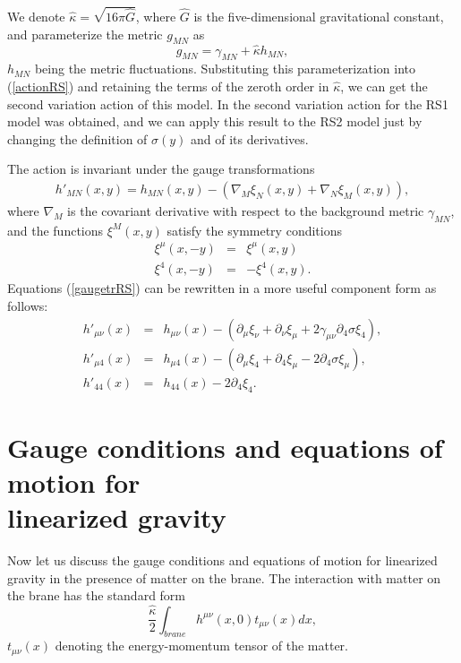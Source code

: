 \documentclass[a4paper,12pt]{article}
\begin{document}
We denote $\hat \kappa = \sqrt{16 \pi \hat G}$, where $\hat G$ is the
five-dimensional gravitational constant, and parameterize the metric
$g_{MN}$ as
\begin{equation}\label{metricpar}
  g_{MN} = \gamma_{MN} + \hat \kappa h_{MN},
\end{equation}
$h_{MN}$ being the metric fluctuations. Substituting this
parameterization into (\ref{actionRS}) and retaining the terms of
the zeroth order in $\hat \kappa$, we can get the second variation
action of this model. In \cite{BKSV} the second
variation action for the  RS1 model was obtained, and we can apply this
result to the RS2 model just  by changing the definition of $\sigma(y)$ and
of its derivatives.

The action is invariant under the gauge transformations
\begin{eqnarray}\label{gaugetrRS}
h'_{MN}(x,y) = h_{MN}(x,y) -(\nabla_M\xi_N(x,y) + \nabla_N\xi_M(x,y) ),
\end{eqnarray}
where $\nabla_M$ is the covariant derivative with respect to the
background metric $\gamma_{MN}$, and the functions $\xi^M(x,y)$
satisfy the symmetry conditions
\begin{eqnarray}\label{orbifoldsym1}
\xi^{\mu}\left(x,-y\right)&=&\xi^{\mu}\left(x,y\right)\\
\nonumber
\xi^{4}\left(x,-y\right)&=&-\xi^{4}\left(x,y\right).
\nonumber
\end{eqnarray}
Equations (\ref{gaugetrRS}) can be rewritten in a more useful
component form as follows:
\begin{eqnarray}\label{gaugetrRSuseful}
h'_{\mu\nu}\left(x\right)&=&h_{\mu\nu}\left(x\right)-\left(
\partial_{\mu}\xi_{\nu} +\partial_{\nu}\xi_{\mu}+2\gamma_{\mu\nu}\partial_{4}\sigma\xi_{4}
\right),\\ \label{gaugetrRSuseful2}
h'_{\mu4}\left(x\right)&=&h_{\mu4}\left(x\right)-\left(
\partial_{\mu}\xi_{4} +\partial_{4}\xi_{\mu}-2\partial_{4}\sigma\xi_{\mu}
\right),\\ \label{gaugetrRSuseful3}
h'_{44}\left(x\right)&=&h_{44}\left(x\right)-2\partial_{4}\xi_{4}.
\end{eqnarray}

\section{Gauge conditions and equations of motion for \\ linearized gravity}
Now let us discuss the gauge conditions  and equations of motion
for linearized gravity in the presence of matter on the brane.
The interaction with matter on the brane has the standard form
\begin{equation}\label{interaction}
 \frac{\hat \kappa}{2} \int_{brane} h^{\mu\nu}(x,0) t_{\mu\nu}(x) dx,
\end{equation}
$t_{\mu\nu}(x)$ denoting the energy-momentum tensor of the matter.
\end{document}
